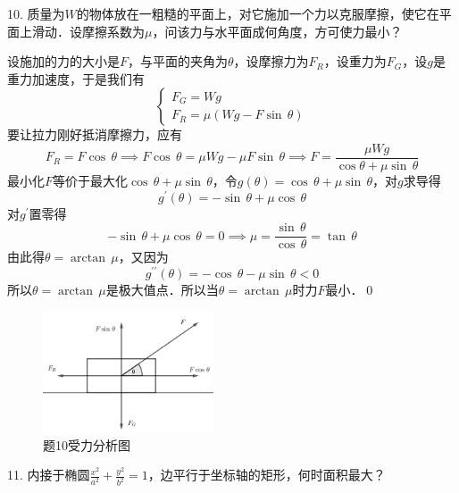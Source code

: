 10. 质量为$W$的物体放在一粗糙的平面上，对它施加一个力以克服摩擦，使它在平面上滑动．设摩擦系数为$\mu$，问该力与水平面成何角度，方可使力最小？

\solve 设施加的力的大小是$F$，与平面的夹角为$\theta$，设摩擦力为$F_{R}$，设重力为$F_{G}$，设$g$是重力加速度，于是我们有
\begin{equation}
    \begin{cases}
        F_{G} = Wg \\
        F_{R} = \mu \left(Wg - F \sin \, \theta\right) 
    \end{cases}
\end{equation}
要让拉力刚好抵消摩擦力，应有
\begin{equation}
    F_{R} = F \cos \, \theta \implies F \cos \, \theta = \mu Wg - \mu F \sin \, \theta \implies F = \frac{\mu W g}{\cos \theta + \mu \sin \, \theta}
\end{equation}
最小化$F$等价于最大化$\cos \, \theta + \mu \sin \, \theta$，令$g(\theta) = \cos \, \theta + \mu \sin \, \theta$，对$g$求导得
\begin{equation}
    g^{\prime}(\theta) = - \sin \, \theta + \mu \cos \, \theta
\end{equation}
对$g^{\prime}$置零得
\begin{equation}
    - \sin \, \theta + \mu \cos \, \theta = 0 \implies \mu = \frac{\sin \, \theta}{\cos \, \theta} = \tan \, \theta
\end{equation}
由此得$\theta = \arctan \, \mu$，又因为
\begin{equation}
    g^{\prime\prime}(\theta) = - \cos \, \theta - \mu \sin \, \theta < 0
\end{equation}
所以$\theta = \arctan \, \mu$是极大值点．所以当$\theta = \arctan \, \mu$时力$F$最小．\qed\bigskip

\begin{figure}[H]
    \centering
    \includegraphics[width=0.45\textwidth]{chapter3/force.png}
    \caption{题10受力分析图}
\end{figure}

11. 内接于椭圆$\displaystyle\frac{x^2}{a^2}+\displaystyle\frac{y^2}{b^2} = 1$，边平行于坐标轴的矩形，何时面积最大？

